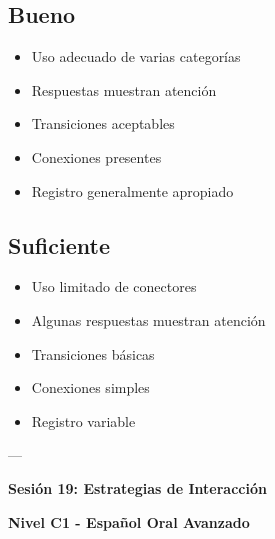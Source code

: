 \documentclass[a4paper,11pt]{article}
\begin{document}
\vspace{0.2cm}

\subsection{Bueno}

\begin{itemize}

  \item Uso adecuado de varias categorías

  \item Respuestas muestran atención

  \item Transiciones aceptables

  \item Conexiones presentes

  \item Registro generalmente apropiado

\end{itemize}

\vspace{0.2cm}

\subsection{Suficiente}

\begin{itemize}

  \item Uso limitado de conectores

  \item Algunas respuestas muestran atención

  \item Transiciones básicas

  \item Conexiones simples

  \item Registro variable

\end{itemize}

\vspace{0.2cm}

---

\vspace{0.2cm}

\textbf{Sesión 19: Estrategias de Interacción}

\textbf{Nivel C1 - Español Oral Avanzado}

\vspace{0.2cm}
\end{document}
